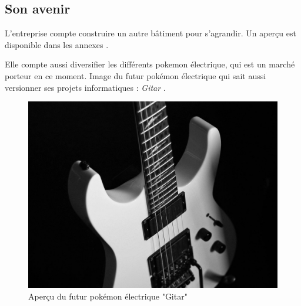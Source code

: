 \documentclass[../main.tex]{subfiles}
\begin{document}
\subsection{Son avenir}

L'entreprise compte construire un autre bâtiment pour s'agrandir. Un aperçu est disponible dans les annexes \figref{\ref{fig:batiment}}.

Elle compte aussi diversifier les différents pokemon électrique, qui est un marché porteur en ce moment.
Image du futur pokémon électrique qui sait aussi versionner ses projets informatiques : \textit{Gitar} \figref{\ref{fig:gitar}}.


\begin{figure}[h]
    \includegraphics[width=0.3\linewidth, center]{images/pokemons/gitar}
    \captionsetup{font=small,labelfont=bf, justification=centering}
    \caption{Aperçu du futur pokémon électrique "Gitar"}
    \label{fig:gitar}
\end{figure}
\end{document}
